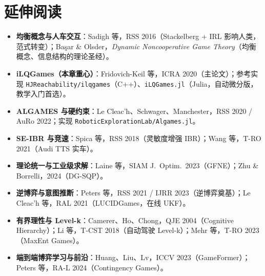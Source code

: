 \section*{延伸阅读}
\begin{itemize}
  \item \textbf{均衡概念与人车交互}：Sadigh 等，RSS 2016\cite{sadigh2016planning}（Stackelberg + IRL 影响人类，范式转变）；Ba\c{s}ar \& Olsder，\emph{Dynamic Noncooperative Game Theory}\cite{basar1999dynamic}（均衡概念、信息结构的理论圣经）。
  \item \textbf{iLQGames（本章重心）}：Fridovich-Keil 等，ICRA 2020\cite{fridovich2020efficient}（主论文）；参考实现 \texttt{HJReachability/ilqgames}（C++）、\texttt{iLQGames.jl}（Julia，自动微分版，教学入门首选）。
  \item \textbf{ALGAMES 与硬约束}：Le Cleac'h、Schwager、Manchester，RSS 2020 / AuRo 2022\cite{lecleach2022algames}；实现 \texttt{RoboticExplorationLab/Algames.jl}。
  \item \textbf{SE-IBR 与竞速}：Spica 等，RSS 2018\cite{spica2020realtime}（灵敏度增强 IBR）；Wang 等，T-RO 2021\cite{wang2021gametheoretic}（Audi TTS 实车）。
  \item \textbf{理论统一与工业级求解}：Laine 等，SIAM J.\ Optim.\ 2023\cite{laine2023computation}（GFNE）；Zhu \& Borrelli，2024\cite{zhu2024dgsqp}（DG-SQP）。
  \item \textbf{逆博弈与意图推断}：Peters 等，RSS 2021 / IJRR 2023\cite{peters2021inferring}（逆博弈奠基）；Le Cleac'h 等，RAL 2021\cite{lecleach2021lucidgames}（LUCIDGames，在线 UKF）。
  \item \textbf{有界理性与 Level-k}：Camerer、Ho、Chong，QJE 2004\cite{camerer2004cognitive}（Cognitive Hierarchy）；Li 等，T-CST 2018\cite{li2018game}（自动驾驶 Level-k）；Mehr 等，T-RO 2023\cite{mehr2023maximum}（MaxEnt Games）。
  \item \textbf{端到端博弈学习与前沿}：Huang、Liu、Lv，ICCV 2023\cite{huang2023gameformer}（GameFormer）；Peters 等，RA-L 2024\cite{peters2024contingency}（Contingency Games）。
\end{itemize}

